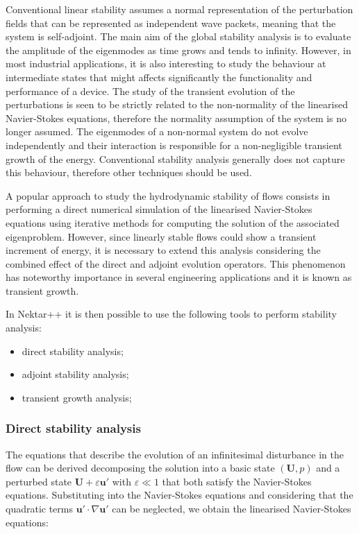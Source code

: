 Conventional linear stability assumes a normal representation of the perturbation fields that can be represented as independent wave packets, meaning that the system is self-adjoint. The main aim of the global stability analysis is to evaluate the amplitude of the eigenmodes as time grows and tends to infinity. However, in most industrial applications, it is also interesting to study the behaviour at intermediate states that might affects significantly the functionality and performance of a device. The study of the transient evolution of the perturbations is seen to be strictly related to the non-normality of the linearised Navier-Stokes equations, therefore the normality assumption of the system is no longer assumed. The eigenmodes of a non-normal system do not evolve independently and their interaction is responsible for a non-negligible transient growth of the energy. Conventional stability analysis generally does not capture this behaviour, therefore other techniques should be used.

A popular approach to study the hydrodynamic stability of flows consists in performing a direct numerical simulation of the linearised Navier-Stokes equations using iterative methods for computing the solution of the associated eigenproblem. However, since linearly stable flows could show a transient increment of energy, it is necessary to extend this analysis considering the combined effect of the direct and adjoint evolution operators. This phenomenon has noteworthy importance in several engineering applications and it is known as transient growth.

In Nektar++ it is then possible to use the following tools to perform stability analysis:

\begin{itemize}
\item direct stability analysis;
\item adjoint stability analysis;
\item  transient growth analysis;
\end{itemize}

\subsubsection{Direct stability analysis}


The equations that describe the evolution of an infinitesimal disturbance in the
flow can be derived decomposing the solution into a basic state $(\mathbf{U},
p)$ and a perturbed state  $\mathbf{U}+\varepsilon \mathbf{u'}$ with
$\varepsilon \ll 1$ that both satisfy the Navier-Stokes equations. Substituting
into the Navier-Stokes equations and considering that the quadratic terms $\mathbf{u'} \cdot \nabla \mathbf{u'}$ can be neglected, we obtain the linearised Navier-Stokes equations:

